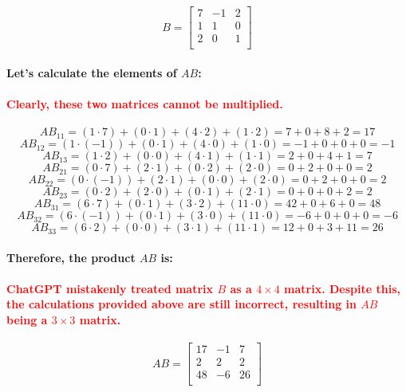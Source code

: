 \documentclass[11pt]{article} %
\begin{document}
\begin{mdframed}
    \[ B = \begin{bmatrix}
            7 & -1 & 2 \\
            1 & 1  & 0 \\
            2 & 0  & 1 \\
        \end{bmatrix} \]
    \paragraph{Let's calculate the elements of \(AB\):}
    \paragraph{\textcolor{red}{Clearly, these two matrices cannot be multiplied.}}
    \[ AB_{11} = (1 \cdot 7) + (0 \cdot 1) + (4 \cdot 2) + (1 \cdot 2) = 7 + 0 + 8 + 2 = 17 \]
    \[ AB_{12} = (1 \cdot (-1)) + (0 \cdot 1) + (4 \cdot 0) + (1 \cdot 0) = -1 + 0 + 0 + 0 = -1 \]
    \[ AB_{13} = (1 \cdot 2) + (0 \cdot 0) + (4 \cdot 1) + (1 \cdot 1) = 2 + 0 + 4 + 1 = 7 \]
    \[ AB_{21} = (0 \cdot 7) + (2 \cdot 1) + (0 \cdot 2) + (2 \cdot 0) = 0 + 2 + 0 + 0 = 2 \]
    \[ AB_{22} = (0 \cdot (-1)) + (2 \cdot 1) + (0 \cdot 0) + (2 \cdot 0) = 0 + 2 + 0 + 0 = 2 \]
    \[ AB_{23} = (0 \cdot 2) + (2 \cdot 0) + (0 \cdot 1) + (2 \cdot 1) = 0 + 0 + 0 + 2 = 2 \]
    \[ AB_{31} = (6 \cdot 7) + (0 \cdot 1) + (3 \cdot 2) + (11 \cdot 0) = 42 + 0 + 6 + 0 = 48 \]
    \[ AB_{32} = (6 \cdot (-1)) + (0 \cdot 1) + (3 \cdot 0) + (11 \cdot 0) = -6 + 0 + 0 + 0 = -6 \]
    \[ AB_{33} = (6 \cdot 2) + (0 \cdot 0) + (3 \cdot 1) + (11 \cdot 1) = 12 + 0 + 3 + 11 = 26 \]
    \paragraph{Therefore, the product \(AB\) is:}
    \paragraph{\textcolor{red}{ChatGPT mistakenly treated matrix \(B\) as a \(4 \times 4\) matrix. Despite this, the calculations provided above are still incorrect, resulting in \(AB\) being a \(3 \times 3\) matrix.}}
    \[ AB = \begin{bmatrix}
            17 & -1 & 7  \\
            2  & 2  & 2  \\
            48 & -6 & 26 \\
        \end{bmatrix} \]

\end{mdframed}
% 
% 
% 
% 
% 
% 
% 
% 
\end{document}
